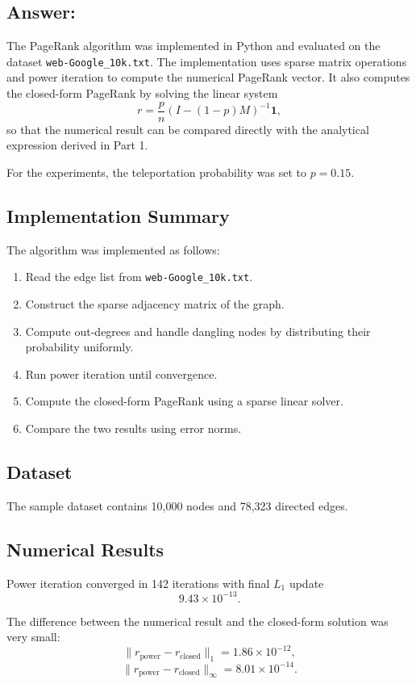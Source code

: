 \documentclass[12pt]{article}
\begin{document}
\subsection*{Answer: }

The PageRank algorithm was implemented in Python and evaluated on the dataset \texttt{web-Google\_10k.txt}. The implementation uses sparse matrix operations and power iteration to compute the numerical PageRank vector. It also computes the closed-form PageRank by solving the linear system
\[
r=\frac{p}{n}(I-(1-p)M)^{-1}\mathbf{1},
\]
so that the numerical result can be compared directly with the analytical expression derived in Part 1.

For the experiments, the teleportation probability was set to $p=0.15$.

\subsection{Implementation Summary}

The algorithm was implemented as follows:
\begin{enumerate}
    \item Read the edge list from \texttt{web-Google\_10k.txt}.
    \item Construct the sparse adjacency matrix of the graph.
    \item Compute out-degrees and handle dangling nodes by distributing their probability uniformly.
    \item Run power iteration until convergence.
    \item Compute the closed-form PageRank using a sparse linear solver.
    \item Compare the two results using error norms.
\end{enumerate}

\subsection{Dataset}

The sample dataset contains 10{,}000 nodes and 78{,}323 directed edges.

\subsection{Numerical Results}

Power iteration converged in 142 iterations with final $L_1$ update
\[
9.43\times 10^{-13}.
\]

The difference between the numerical result and the closed-form solution was very small:
\[
\|r_{\text{power}}-r_{\text{closed}}\|_1 = 1.86\times 10^{-12},
\]
\[
\|r_{\text{power}}-r_{\text{closed}}\|_\infty = 8.01\times 10^{-14}.
\]
\end{document}
